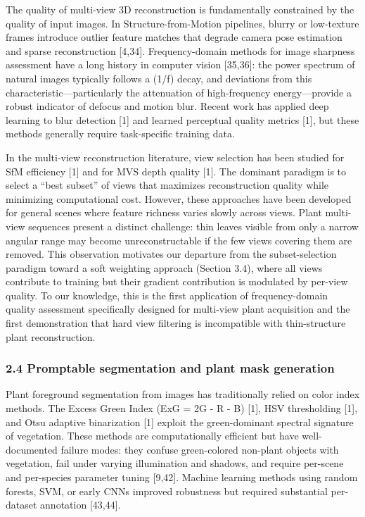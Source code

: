 \documentclass[11pt,a4paper]{article}
\begin{document}
The quality of multi-view 3D reconstruction is fundamentally constrained
by the quality of input images. In Structure-from-Motion pipelines,
blurry or low-texture frames introduce outlier feature matches that
degrade camera pose estimation and sparse reconstruction {[}4,34{]}.
Frequency-domain methods for image sharpness assessment have a long
history in computer vision {[}35,36{]}: the power spectrum of natural
images typically follows a (1/f) decay, and deviations from this
characteristic---particularly the attenuation of high-frequency
energy---provide a robust indicator of defocus and motion blur. Recent
work has applied deep learning to blur detection {[}1{]} and learned
perceptual quality metrics {[}1{]}, but these methods generally require
task-specific training data.

In the multi-view reconstruction literature, view selection has been
studied for SfM efficiency {[}1{]} and for MVS depth quality {[}1{]}.
The dominant paradigm is to select a ``best subset'' of views that
maximizes reconstruction quality while minimizing computational cost.
However, these approaches have been developed for general scenes where
feature richness varies slowly across views. Plant multi-view sequences
present a distinct challenge: thin leaves visible from only a narrow
angular range may become unreconstructable if the few views covering
them are removed. This observation motivates our departure from the
subset-selection paradigm toward a soft weighting approach (Section
3.4), where all views contribute to training but their gradient
contribution is modulated by per-view quality. To our knowledge, this is
the first application of frequency-domain quality assessment
specifically designed for multi-view plant acquisition and the first
demonstration that hard view filtering is incompatible with
thin-structure plant reconstruction.

\subsubsection{2.4 Promptable segmentation and plant mask
generation}\label{promptable-segmentation-and-plant-mask-generation}

Plant foreground segmentation from images has traditionally relied on
color index methods. The Excess Green Index (ExG = 2G - R - B) {[}1{]},
HSV thresholding {[}1{]}, and Otsu adaptive binarization {[}1{]} exploit
the green-dominant spectral signature of vegetation. These methods are
computationally efficient but have well-documented failure modes: they
confuse green-colored non-plant objects with vegetation, fail under
varying illumination and shadows, and require per-scene and per-species
parameter tuning {[}9,42{]}. Machine learning methods using random
forests, SVM, or early CNNs improved robustness but required substantial
per-dataset annotation {[}43,44{]}.
\end{document}
